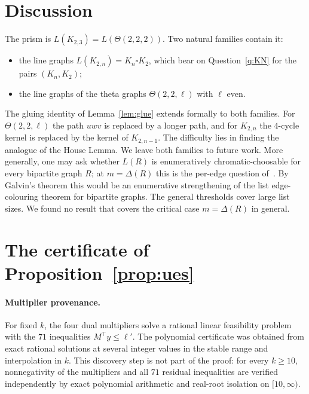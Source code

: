 \documentclass[11pt]{amsart}
\theoremstyle{definition}
\theoremstyle{remark}
\newcommand{\1}{\mathbf 1}
\begin{document}
\section{Discussion}\label{sec:discussion}

The prism is $L(K_{2,3})=L(\Theta(2,2,2))$. Two natural families contain it:
\begin{itemize}
\item the line graphs $L(K_{2,n})=K_n\square K_2$, which bear on Question~\ref{q:KN} for the pairs
  $(K_n,K_2)$;
\item the line graphs of the theta graphs $\Theta(2,2,\ell)$ with $\ell$ even.
\end{itemize}
The gluing identity of Lemma~\ref{lem:glue} extends formally to both families. For
$\Theta(2,2,\ell)$ the path $uwv$ is replaced by a longer path, and for $K_{2,n}$ the $4$-cycle kernel is
replaced by the kernel of $K_{2,n-1}$. The difficulty lies in finding the analogue of the House Lemma. We leave both families to future work. More generally, one may ask whether
$L(R)$ is enumeratively chromatic-choosable for every bipartite graph $R$; at $m=\Delta(R)$ this is the
per-edge question of~\cite{TagueExact}. By Galvin's theorem this
would be an enumerative strengthening of the list edge-colouring theorem for bipartite graphs.
The general thresholds \cite{DZ23,ZD26,KirovLean} cover large list sizes. We found no result that covers
the critical case $m=\Delta(R)$ in general.

\appendix
\section{The certificate of Proposition~\ref{prop:ues}}\label{app:ues}

\paragraph{Multiplier provenance.}
For fixed $k$, the four dual multipliers solve a rational linear feasibility problem with the
$71$ inequalities $M^\top y\le\ell'$. The polynomial certificate was obtained from exact rational
solutions at several integer values in the stable range and interpolation in $k$. This discovery
step is not part of the proof: for every $k\ge10$, nonnegativity of the multipliers and all $71$
residual inequalities are verified independently by exact polynomial arithmetic and real-root
isolation on $[10,\infty)$.
\end{document}
